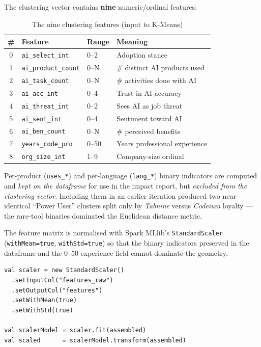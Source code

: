 \documentclass[11pt,a4paper]{article}
\begin{document}
The clustering vector contains \textbf{nine} numeric/ordinal features:

\begin{table}[H]
\centering
\caption{The nine clustering features (input to K-Means)}
\begin{tabular}{cp{4.4cm}p{2.5cm}p{4.5cm}}
\toprule
\textbf{\#} & \textbf{Feature} & \textbf{Range} & \textbf{Meaning} \\
\midrule
0 & \texttt{ai\_select\_int}    & 0--2  & Adoption stance \\
1 & \texttt{ai\_product\_count} & 0--N  & \# distinct AI products used \\
2 & \texttt{ai\_task\_count}    & 0--N  & \# activities done with AI \\
3 & \texttt{ai\_acc\_int}       & 0--4  & Trust in AI accuracy \\
4 & \texttt{ai\_threat\_int}    & 0--2  & Sees AI as job threat \\
5 & \texttt{ai\_sent\_int}      & 0--4  & Sentiment toward AI \\
6 & \texttt{ai\_ben\_count}     & 0--N  & \# perceived benefits \\
7 & \texttt{years\_code\_pro}   & 0--50 & Years professional experience \\
8 & \texttt{org\_size\_int}     & 1--9  & Company-size ordinal \\
\bottomrule
\end{tabular}
\end{table}

Per-product (\texttt{uses\_*}) and per-language (\texttt{lang\_*}) binary
indicators are computed and \emph{kept on the dataframe} for use in the
impact report, but \emph{excluded from the clustering vector}. Including
them in an earlier iteration produced two near-identical ``Power User''
clusters split only by \textit{Tabnine} versus \textit{Codeium} loyalty
--- the rare-tool binaries dominated the Euclidean distance metric.

The feature matrix is normalised with Spark MLlib's \texttt{StandardScaler}
(\texttt{withMean=true}, \texttt{withStd=true}) so that the binary indicators
preserved in the dataframe and the 0--50 experience field cannot dominate
the geometry.

\begin{lstlisting}[caption={Feature scaling}]
val scaler = new StandardScaler()
  .setInputCol("features_raw")
  .setOutputCol("features")
  .setWithMean(true)
  .setWithStd(true)

val scalerModel = scaler.fit(assembled)
val scaled      = scalerModel.transform(assembled)
\end{lstlisting}
\end{document}
